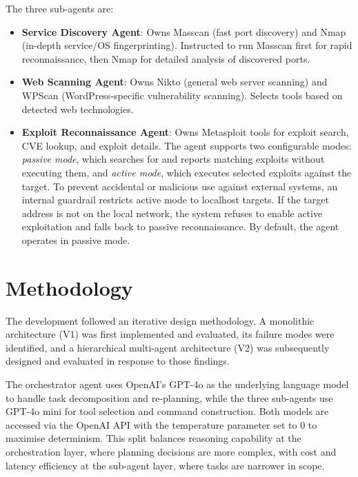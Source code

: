 \documentclass[sigconf,anonymous]{acmart}
\begin{document}
The three sub-agents are:

\begin{itemize}[leftmargin=*]
    \item \textbf{Service Discovery Agent}: Owns Masscan (fast port discovery) and Nmap (in-depth service/OS fingerprinting). Instructed to run Masscan first for rapid reconnaissance, then Nmap for detailed analysis of discovered ports.
    \item \textbf{Web Scanning Agent}: Owns Nikto (general web server scanning) and WPScan (WordPress-specific vulnerability scanning). Selects tools based on detected web technologies.
    \item \textbf{Exploit Reconnaissance Agent}: Owns Metasploit tools for exploit search, CVE lookup, and exploit details. The agent supports two configurable modes: \emph{passive mode}, which searches for and reports matching exploits without executing them, and \emph{active mode}, which executes selected exploits against the target. To prevent accidental or malicious use against external systems, an internal guardrail restricts active mode to localhost targets. If the target address is not on the local network, the system refuses to enable active exploitation and falls back to passive reconnaissance. By default, the agent operates in passive mode.
\end{itemize}

\section{Methodology}
\label{sec:methodology}

The development followed an iterative design methodology. A monolithic architecture (V1) was first implemented and evaluated, its failure modes were identified, and a hierarchical multi-agent architecture (V2) was subsequently designed and evaluated in response to those findings.

The orchestrator agent uses OpenAI's GPT-4o as the underlying language model to handle task decomposition and re-planning, while the three sub-agents use GPT-4o mini for tool selection and command construction. Both models are accessed via the OpenAI API with the temperature parameter set to 0 to maximise determinism. This split balances reasoning capability at the orchestration layer, where planning decisions are more complex, with cost and latency efficiency at the sub-agent layer, where tasks are narrower in scope.
\end{document}
